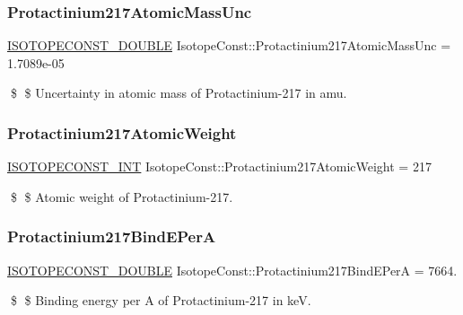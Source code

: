 \subsubsection{\texorpdfstring{Protactinium217\+Atomic\+Mass\+Unc}{Protactinium217AtomicMassUnc}}
{\footnotesize\ttfamily \mbox{\hyperlink{group___isotope_const-_macros_ga8f45a7272ce02c0b4c65c44636ed719a}{I\+S\+O\+T\+O\+P\+E\+C\+O\+N\+S\+T\+\_\+\+D\+O\+U\+B\+LE}} Isotope\+Const\+::\+Protactinium217\+Atomic\+Mass\+Unc = 1.\+7089e-\/05}

\$ \$ Uncertainty in atomic mass of Protactinium-\/217 in amu. \mbox{\label{group___isotope_const-_protactinium-_pa217_ga4296e2aeab5e8f8d2cbce3bcac97be82}} 
\subsubsection{\texorpdfstring{Protactinium217\+Atomic\+Weight}{Protactinium217AtomicWeight}}
{\footnotesize\ttfamily \mbox{\hyperlink{group___isotope_const-_macros_ga5f18360b3e99483a35c32d789e62621c}{I\+S\+O\+T\+O\+P\+E\+C\+O\+N\+S\+T\+\_\+\+I\+NT}} Isotope\+Const\+::\+Protactinium217\+Atomic\+Weight = 217}

\$ \$ Atomic weight of Protactinium-\/217. \mbox{\label{group___isotope_const-_protactinium-_pa217_ga13d7fc0a2aaaa8dc75f91432bc67ddac}} 
\subsubsection{\texorpdfstring{Protactinium217\+Bind\+E\+PerA}{Protactinium217BindEPerA}}
{\footnotesize\ttfamily \mbox{\hyperlink{group___isotope_const-_macros_ga8f45a7272ce02c0b4c65c44636ed719a}{I\+S\+O\+T\+O\+P\+E\+C\+O\+N\+S\+T\+\_\+\+D\+O\+U\+B\+LE}} Isotope\+Const\+::\+Protactinium217\+Bind\+E\+PerA = 7664.}

\$ \$ Binding energy per A of Protactinium-\/217 in keV. \mbox{\label{group___isotope_const-_protactinium-_pa217_gaeb756034ef5d8578a622f823bc33299e}} 
